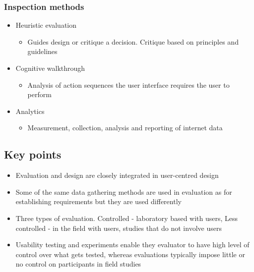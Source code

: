 \documentclass{article}[18pt]
\begin{document}
\subsubsection{Inspection methods}
\begin{itemize}
	\item Heuristic evaluation
	\begin{itemize}
		\item Guides design or critique a decision. Critique based on principles and guidelines
	\end{itemize}
	\item Cognitive walkthrough
	\begin{itemize}
		\item Analysis of action sequences the user interface requires the user to perform
	\end{itemize}
	\item Analytics
	\begin{itemize}
		\item Measurement, collection, analysis and reporting of internet data
	\end{itemize}
\end{itemize}
\subsection{Key points}
\begin{itemize}
	\item Evaluation and design are closely integrated in user-centred design
	\item Some of the same data gathering methods are used in evaluation as for establishing requirements but they are used differently
	\item Three types of evaluation. Controlled - laboratory based with users, Less controlled - in the field with users, studies that do not involve users
	\item Usability testing and experiments enable they evaluator to have high level of control over what gets tested, whereas evaluations typically impose little or no control on participants in field studies 
\end{itemize}
\end{document}

